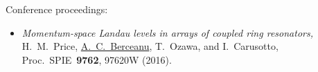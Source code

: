 Conference proceedings:
\begin{itemize}

\item

  \emph{Momentum-space Landau levels in arrays of coupled ring resonators,}\\
  H.~M.~Price, \underline{A.~C.~Berceanu}, T.~Ozawa, and I.~Carusotto,\\
  Proc.\ SPIE\ \textbf{9762}, 97620W (2016).


\end{itemize}


